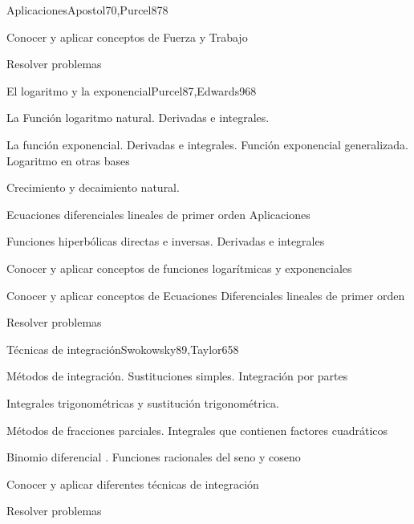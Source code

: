 \begin{syllabus}
\begin{unit}{Aplicaciones}{Apostol70,Purcel87}{8}
\begin{unitgoals}
	\item Conocer y aplicar conceptos de Fuerza y Trabajo
	\item Resolver problemas
\end{unitgoals}
\end{unit}

\begin{unit}{El logaritmo y la exponencial}{Purcel87,Edwards96}{8}
\begin{topics}
	\item La Función logaritmo natural. Derivadas e integrales.
	\item La función exponencial. Derivadas e integrales. Función exponencial  generalizada. Logaritmo en otras bases
	\item Crecimiento y decaimiento natural. 
	\item Ecuaciones diferenciales lineales de primer orden Aplicaciones
	\item Funciones hiperbólicas directas e inversas. Derivadas e integrales
\end{topics}

\begin{unitgoals}
	\item Conocer y aplicar conceptos de funciones logarítmicas y exponenciales
	\item Conocer y aplicar conceptos de Ecuaciones Diferenciales lineales de primer orden
	\item Resolver problemas
\end{unitgoals}
\end{unit}

\begin{unit}{Técnicas de integración}{Swokowsky89,Taylor65}{8}
\begin{topics}
	\item Métodos de integración. Sustituciones simples. Integración por partes
	\item Integrales trigonométricas y sustitución trigonométrica.
	\item Métodos de fracciones parciales. Integrales que contienen factores  cuadráticos
	\item Binomio diferencial . Funciones racionales del seno y coseno
\end{topics}

\begin{unitgoals}
	\item Conocer y aplicar diferentes técnicas de integración
	\item Resolver problemas
\end{unitgoals}
\end{unit}


\end{syllabus}
